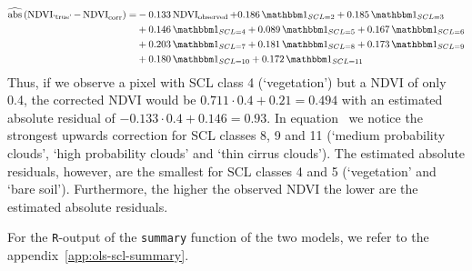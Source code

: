 	\begin{equation}\label{eq:corr_lm_res}
		\begin{aligned}		
			\widehat{\operatorname{abs}}\left({\operatorname{NDVI}_\text{`true'} - \operatorname{NDVI}}_{\text{corr}}\right)  = &
			-0.133 \operatorname{NDVI}_\text{observed}  
			+ 0.186 \, \mathbbm 1_{{SCL = 2}} 
			+ 0.185 \, \mathbbm 1_{{SCL = 3}} \\ &
			+ 0.146 \, \mathbbm 1_{{SCL = 4}} 
			+ 0.089 \, \mathbbm 1_{{SCL = 5}} 
			+ 0.167 \, \mathbbm 1_{{SCL = 6}} \\ &
			+ 0.203 \, \mathbbm 1_{{SCL = 7}} 
			+ 0.181 \, \mathbbm 1_{{SCL = 8}}  
			+ 0.173 \, \mathbbm 1_{{SCL = 9}} \\ &
			+ 0.180 \, \mathbbm 1_{{SCL = 10}} 
			+ 0.172 \, \mathbbm 1_{{SCL = 11}} 
		\end{aligned}
	\end{equation} 
	Thus, if we observe a pixel with SCL class 4 (`vegetation') but a NDVI of only 0.4, the corrected NDVI would be $0.711 \cdot 0.4 + 0.21 = 0.494$ with an estimated absolute residual of $-0.133 \cdot 0.4 + 0.146 = 0.93$.
	In equation~ we notice the strongest upwards correction for SCL classes 8, 9 and 11 (`medium probability clouds', `high probability clouds' and `thin cirrus clouds'). The estimated absolute residuals, however, are the smallest for SCL classes 4 and 5 (`vegetation' and `bare soil'). Furthermore, the higher the observed NDVI the lower are the estimated absolute residuals.

	For the \texttt{R}-output of the \texttt{summary} function of the two models, we refer to the appendix~\ref{app:ols-scl-summary}. 


	







